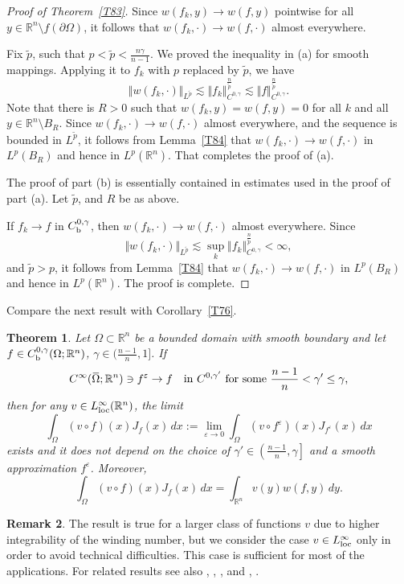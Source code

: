 \documentclass[intlimits,12pt,reqno]{amsart}
\newcommand{\R}{\mathbb R}
\newcommand{\overbar}[1]{\mkern 1.7mu\overline{\mkern-1.7mu#1\mkern-1.5mu}\mkern 1.5mu}
\newcommand{\eps}{\varepsilon}
\numberwithin{equation}{section}
\newtheorem{theorem}{Theorem}[section]
\theoremstyle{definition}
\newtheorem{remark}[theorem]{Remark}
\begin{document}
\begin{proof}[Proof of Theorem~\ref{T83}]
Since $w(f_k,y)\to w(f,y)$ pointwise for all $y\in\R^n\setminus f(\partial\Omega)$, it follows that $w(f_k,\cdot)\to w(f,\cdot)$ almost everywhere.

Fix $\tilde{p}$, such that 
$p<\tilde{p}<\frac{n\gamma}{n-1}$.
We proved the inequality in (a) for smooth mappings. Applying it to $f_k$ with $p$ replaced by $\tilde{p}$, we have
$$
\Vert w(f_k,\cdot)\Vert_{L^{\tilde{p}}}\lesssim
\Vert f_k\Vert_{C^{0,\gamma}}^{\frac{n}{\tilde{p}}}\lesssim
\Vert f\Vert_{C^{0,\gamma}}^{\frac{n}{\tilde{p}}}.
$$
Note that there is $R>0$ such that $w(f_k,y)=w(f,y)=0$ for all $k$ and all $y\in \R^n\setminus B_R$. Since $w(f_k,\cdot)\to w(f,\cdot)$ almost everywhere, and the sequence is bounded in $L^{\tilde{p}}$, it follows from Lemma~\ref{T84} that $w(f_k,\cdot)\to w(f,\cdot)$ in $L^p(B_R)$ and hence in $L^p(\R^n)$. That completes the proof of (a).

The proof of part (b) is essentially contained in estimates used in the proof of part (a). Let $\tilde{p}$, and $R$ be as above.

If $f_k\to f$ in $C_{\rm b}^{0,\gamma}$, then $w(f_k,\cdot)\to w(f,\cdot)$ almost everywhere. Since
$$
\Vert w(f_k,\cdot)\Vert_{L^{\tilde{p}}}\lesssim\sup_k\Vert f_k\Vert^{\frac{n}{\tilde{p}}}_{C^{0,{\gamma}}}<\infty,
$$
and $\tilde{p}>p$, it follows from Lemma~\ref{T84} that $w(f_k,\cdot)\to w(f,\cdot)$ in $L^p(B_R)$ and hence in $L^p(\R^n)$.
The proof is complete.
\end{proof}
Compare the next result with Corollary~\ref{T76}. 
\begin{theorem}
\label{T88}
Let $\Omega\subset\R^n$ be a bounded domain with smooth boundary and let $f\in C_{\rm b}^{0,\gamma}(\Omega;\R^n)$, $\gamma\in\big(\frac{n-1}{n},1\big]$. If 
$$
C^\infty(\overbar{\Omega};\R^n)\ni f^\eps\to f
\quad
\text{in $C^{0,\gamma'}$ for some $\frac{n-1}{n}<\gamma'\leq\gamma$,}
$$
then  for any $v\in L^\infty_{\rm loc}(\R^n)$, the limit
\begin{equation}
\label{eq109}
\int_\Omega (v\circ f)(x)J_f(x)\, dx:=
\lim_{\eps\to 0}
\int_\Omega (v\circ f^\eps)(x)J_{f^\eps}(x)\, dx
\end{equation}
exists and it does not depend on the choice of $\gamma'\in \left(\frac{n-1}{n},\gamma\right]$ and a smooth approximation $f^\eps$. Moreover,
\begin{equation}
\label{eq110}
\int_\Omega (v\circ f)(x)J_f(x)\, dx=\int_{\R^n} v(y) w(f,y)\, dy.
\end{equation}
\end{theorem}
\begin{remark}
\label{R6}
The result is true for a larger class of functions $v$ due to higher integrability of the winding number, but we consider the case $v\in L^\infty_{\rm loc}$ only in order to avoid technical difficulties. This case is sufficient for most of the applications. For related results see also 
\cite[Proposition~6]{Conti}, \cite[Lemma~2.2]{LZ},
\cite[Proposition 7.1]{LP17}, and \cite[Lemma 3.1.]{LPS21}, \cite[Theorem~1.3]{ZustGAFA}.
\end{remark}
\end{document}
